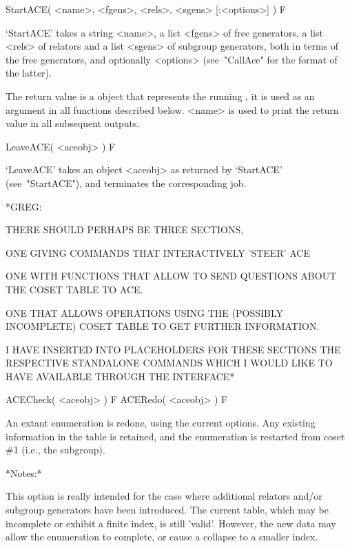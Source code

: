 

\>StartACE( <name>, <fgens>, <rels>, <sgens> [:<options>] ) F

`StartACE' takes a string <name>, a list <fgens> of free generators,
a list <rels> of relators and a list <sgens> of subgroup generators,
both in terms of the free generators, and optionally <options>
(see~"CallAce" for the format of the latter).

The return value is a {\GAP} object that represents the running {\ACE},
it is used as an argument in all functions described below.
<name> is used to print the return value in all subsequent outputs.

\>LeaveACE( <aceobj> ) F

`LeaveACE' takes an object <aceobj> as returned by `StartACE'
(see~"StartACE"), and terminates the corresponding {\ACE} job.

\begintt
*GREG:

THERE SHOULD PERHAPS BE THREE SECTIONS, 

ONE GIVING COMMANDS THAT INTERACTIVELY 'STEER' ACE

ONE WITH FUNCTIONS THAT ALLOW  TO SEND QUESTIONS ABOUT THE COSET TABLE
TO ACE.

ONE THAT ALLOWS OPERATIONS USING THE (POSSIBLY INCOMPLETE) COSET TABLE
TO GET FURTHER INFORMATION.

I HAVE  INSERTED INTO PLACEHOLDERS  FOR THESE SECTIONS  THE RESPECTIVE
STANDALONE COMMANDS WHICH  I WOULD LIKE TO HAVE  AVAILABLE THROUGH THE
INTERFACE*
\endtt



\>ACECheck( <aceobj> ) F
\>ACERedo( <aceobj> ) F

An extant  enumeration is redone,  using the current  options.  Any
existing information in the table  is retained, and the enumeration is
restarted from coset \#1 (i.e., the subgroup).

*Notes:*

This option is really intended  for the case where additional relators
and/or subgroup  generators have been introduced.   The current table,
which may be  incomplete or exhibit a finite  index, is still 'valid'.
However, the new data may  allow the enumeration to complete, or cause
a collapse to a smaller index.

